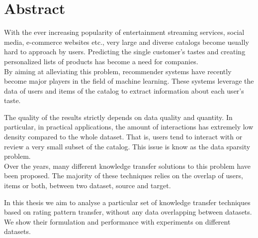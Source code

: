 \chapter*{Abstract}

With the ever increasing popularity of entertainment streaming services, social media, e-commerce websites etc., very large and diverse catalogs become usually hard to approach by users. Predicting the single customer's tastes and creating personalized lists of products has become a need for companies.\\
By aiming at alleviating this problem, recommender systems have recently become major players in the field of machine learning. These systems leverage the data of users and items of the catalog to extract information about each user's taste.\par
The quality of the results strictly depends on data quality and quantity. In particular, in practical applications, the amount of interactions has extremely low density compared to the whole dataset. That is, users tend to interact with or review a very small subset of the catalog. This issue is know as the data sparsity problem.\\
Over the years, many different knowledge transfer solutions to this problem have been proposed. The majority of these techniques relies on the overlap of users, items or both, between two dataset, source and target.\par
In this thesis we aim to analyse a particular set of knowledge transfer techniques based on rating pattern transfer, without any data overlapping between datasets. We show their formulation and performance with experiments on different datasets.